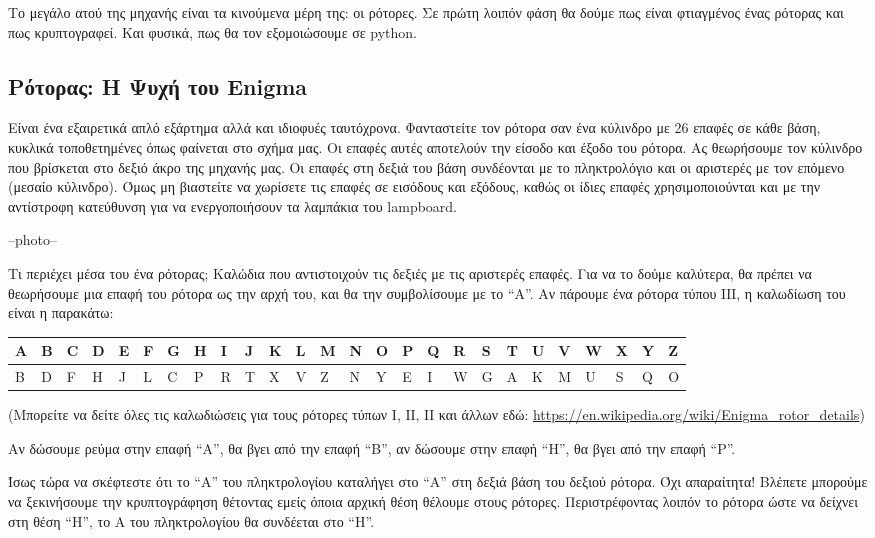 \documentclass[a4paper,twoside,12pt]{article}
\begin{document}
Το μεγάλο ατού της μηχανής είναι τα κινούμενα μέρη της: οι ρότορες. Σε πρώτη λοιπόν φάση θα δούμε πως είναι φτιαγμένος ένας ρότορας και πως κρυπτογραφεί. Και φυσικά, πως θα τον εξομοιώσουμε σε python.

\subsection{Ρότορας: Η Ψυχή του Enigma}

Είναι ένα εξαιρετικά απλό εξάρτημα αλλά και ιδιοφυές ταυτόχρονα. Φανταστείτε τον ρότορα σαν ένα κύλινδρο με 26 επαφές σε κάθε βάση, κυκλικά τοποθετημένες όπως φαίνεται στο σχήμα μας. Οι επαφές αυτές αποτελούν την είσοδο και έξοδο του ρότορα. Ας θεωρήσουμε τον κύλινδρο που βρίσκεται στο δεξιό άκρο της μηχανής μας. Οι επαφές στη δεξιά του βάση συνδέονται με το πληκτρολόγιο και οι αριστερές με τον επόμενο (μεσαίο κύλινδρο).  Όμως μη βιαστείτε να χωρίσετε τις επαφές σε εισόδους και εξόδους, καθώς οι ίδιες επαφές χρησιμοποιούνται και με την αντίστροφη κατεύθυνση για να ενεργοποιήσουν τα λαμπάκια του lampboard.

--photo--

Τι περιέχει μέσα του ένα ρότορας; Καλώδια που αντιστοιχούν τις δεξιές με τις αριστερές επαφές. Για να το δούμε καλύτερα, θα πρέπει να θεωρήσουμε μια επαφή του ρότορα ως την αρχή του, και θα την συμβολίσουμε με το “Α”. Αν πάρουμε ένα ρότορα τύπου ΙΙΙ, η καλωδίωση του είναι η παρακάτω:

\begin{center}
\begin{tabularx}{\textwidth}{|*{26}{>{\centering\arraybackslash}X|}}
\hline
A&B&C&D&E&F&G&H&I&J&K&L&M&N&O&P&Q&R&S&T&U&V&W&X&Y&Z\\
\hline
B&D&F&H&J&L&C&P&R&T&X&V&Z&N&Y&E&I&W&G&A&K&M&U&S&Q&O\\
\hline
\end{tabularx}
\end{center}

(Μπορείτε να δείτε όλες τις καλωδιώσεις για τους ρότορες τύπων Ι, ΙΙ, ΙΙ και άλλων εδώ: \url{https://en.wikipedia.org/wiki/Enigma_rotor_details})

Αν δώσουμε ρεύμα στην επαφή “Α”, θα βγει από την επαφή “Β”, αν δώσουμε στην επαφή “Η”, θα βγει από την επαφή “P”.

Ίσως τώρα να σκέφτεστε ότι το “Α” του πληκτρολογίου καταλήγει στο “Α” στη δεξιά βάση του δεξιού ρότορα. Όχι απαραίτητα! Βλέπετε μπορούμε να ξεκινήσουμε την κρυπτογράφηση θέτοντας εμείς όποια αρχική θέση θέλουμε στους ρότορες. Περιστρέφοντας λοιπόν το ρότορα ώστε να δείχνει στη θέση “Η”, το Α του πληκτρολογίου θα συνδέεται στο “Η”. 
\end{document}
